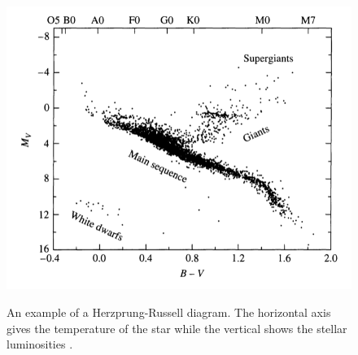 \begin{figure}
\includegraphics[width=\linewidth]{figures/hrDiagram.png}
\label{fig: HR_diagram}
\caption{An example of a Herzprung-Russell diagram. The horizontal axis gives the temperature of the star while the vertical shows the stellar luminosities \cite{CarrollOstlieBook}.}
\end{figure}

